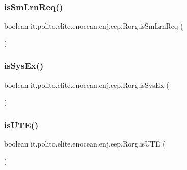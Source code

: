 \subsubsection{\texorpdfstring{is\+Sm\+Lrn\+Req()}{isSmLrnReq()}}
{\footnotesize\ttfamily boolean it.\+polito.\+elite.\+enocean.\+enj.\+eep.\+Rorg.\+is\+Sm\+Lrn\+Req (\begin{DoxyParamCaption}{ }\end{DoxyParamCaption})}

\hypertarget{classit_1_1polito_1_1elite_1_1enocean_1_1enj_1_1eep_1_1_rorg_aa16c4143f4b42cf2a24e07a5ad501c17}{}\label{classit_1_1polito_1_1elite_1_1enocean_1_1enj_1_1eep_1_1_rorg_aa16c4143f4b42cf2a24e07a5ad501c17} 
\subsubsection{\texorpdfstring{is\+Sys\+Ex()}{isSysEx()}}
{\footnotesize\ttfamily boolean it.\+polito.\+elite.\+enocean.\+enj.\+eep.\+Rorg.\+is\+Sys\+Ex (\begin{DoxyParamCaption}{ }\end{DoxyParamCaption})}

\hypertarget{classit_1_1polito_1_1elite_1_1enocean_1_1enj_1_1eep_1_1_rorg_a332d98c0f3c2f30cd0f3f69c964a193e}{}\label{classit_1_1polito_1_1elite_1_1enocean_1_1enj_1_1eep_1_1_rorg_a332d98c0f3c2f30cd0f3f69c964a193e} 
\subsubsection{\texorpdfstring{is\+U\+T\+E()}{isUTE()}}
{\footnotesize\ttfamily boolean it.\+polito.\+elite.\+enocean.\+enj.\+eep.\+Rorg.\+is\+U\+TE (\begin{DoxyParamCaption}{ }\end{DoxyParamCaption})}

\hypertarget{classit_1_1polito_1_1elite_1_1enocean_1_1enj_1_1eep_1_1_rorg_ae0b182a3db577554f5f2f4fcd6beb040}{}\label{classit_1_1polito_1_1elite_1_1enocean_1_1enj_1_1eep_1_1_rorg_ae0b182a3db577554f5f2f4fcd6beb040} 
